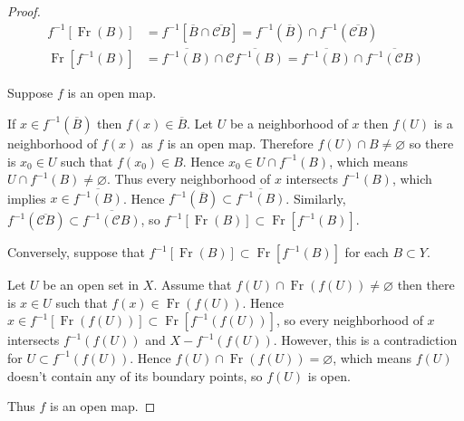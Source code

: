\begin{proof}
    \begingroup
    \allowdisplaybreaks%
    \begin{align*}
        f^{-1}\left\lbrack \operatorname{Fr}(B) \right\rbrack & = f^{-1}\left\lbrack \overline{B} \cap \overline{\mathscr{C}B} \right\rbrack = f^{-1}(\overline{B}) \cap f^{-1}(\overline{\mathscr{C}B}) \\
        \operatorname{Fr}\left\lbrack f^{-1}(B) \right\rbrack & = \overline{f^{-1}(B)} \cap \overline{\mathscr{C}f^{-1}(B)} = \overline{f^{-1}(B)} \cap \overline{f^{-1}(\mathscr{C}B)}
    \end{align*}
    \endgroup

    Suppose \( f \) is an open map.

    If \( x \in f^{-1}(\overline{B}) \) then \( f(x) \in \overline{B} \). Let \( U \) be a neighborhood of \( x \) then \( f(U) \) is a neighborhood of \( f(x) \) as \( f \) is an open map. Therefore \( f(U) \cap B \ne \varnothing \) so there is \( x_{0} \in U \) such that \( f(x_{0}) \in B \). Hence \( x_{0} \in U \cap f^{-1}(B) \), which means \( U \cap f^{-1}(B) \ne \varnothing \). Thus every neighborhood of \( x \) intersects \( f^{-1}(B) \), which implies \( x \in \overline{f^{-1}(B)} \). Hence \( f^{-1}(\overline{B}) \subset \overline{f^{-1}(B)} \). Similarly, \( f^{-1}(\overline{\mathscr{C}B}) \subset \overline{f^{-1}(\mathscr{C}B)} \), so \( f^{-1}\left\lbrack \operatorname{Fr}(B) \right\rbrack \subset \operatorname{Fr}\left\lbrack f^{-1}(B) \right\rbrack \).

    \bigskip

    Conversely, suppose that \( f^{-1}\left\lbrack \operatorname{Fr}(B) \right\rbrack \subset \operatorname{Fr}\left\lbrack f^{-1}(B) \right\rbrack \) for each \( B \subset Y \).

    Let \( U \) be an open set in \( X \). Assume that \( f(U) \cap \operatorname{Fr}(f(U)) \ne \varnothing \) then there is \( x\in U \) such that \( f(x) \in \operatorname{Fr}(f(U)) \). Hence \( x \in f^{-1}\left\lbrack \operatorname{Fr}(f(U)) \right\rbrack \subset \operatorname{Fr}\left\lbrack f^{-1}(f(U)) \right\rbrack \), so every neighborhood of \( x \) intersects \( f^{-1}(f(U)) \) and \( X - f^{-1}(f(U)) \). However, this is a contradiction for \( U \subset f^{-1}(f(U)) \). Hence \( f(U) \cap \operatorname{Fr}(f(U)) = \varnothing \), which means \( f(U) \) doesn't contain any of its boundary points, so \( f(U) \) is open.

    Thus \( f \) is an open map.
\end{proof}

